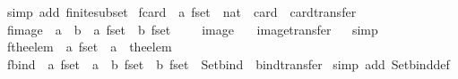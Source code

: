 \begin{isabellebody}
%
\isadelimproof
%
\endisadelimproof
%
\isatagproof
{}\isamarkupfalse%
\ {\isacharparenleft}simp\ add{\isacharcolon}\ finite{\isacharunderscore}subset{\isacharparenright}%
\endisatagproof
{\isafoldproof}%
%
\isadelimproof
\isanewline
%
\endisadelimproof
\isanewline
{}\isamarkupfalse%
\ fcard\ {\isacharcolon}{\isacharcolon}\ {\isachardoublequoteopen}{\isacharprime}a\ fset\ {\isasymRightarrow}\ nat{\isachardoublequoteclose}\ \ card\ \ card{\isacharunderscore}transfer%
\isadelimproof
\ %
\endisadelimproof
%
\isatagproof
\isacommand{{\isachardot}}\isamarkupfalse%
%
\endisatagproof
{\isafoldproof}%
%
\isadelimproof
%
\endisadelimproof
\isanewline
\isanewline
{}\isamarkupfalse%
\ fimage\ {\isacharcolon}{\isacharcolon}\ {\isachardoublequoteopen}{\isacharparenleft}{\isacharprime}a\ {\isasymRightarrow}\ {\isacharprime}b{\isacharparenright}\ {\isasymRightarrow}\ {\isacharprime}a\ fset\ {\isasymRightarrow}\ {\isacharprime}b\ fset{\isachardoublequoteclose}\ {\isacharparenleft}\ {\isachardoublequoteopen}{\isacharbar}{\isacharbackquote}{\isacharbar}{\isachardoublequoteclose}\ {}{}{\isacharparenright}\ \ image\isanewline
\ \ \ image{\isacharunderscore}transfer%
\isadelimproof
\ %
\endisadelimproof
%
\isatagproof
{}\isamarkupfalse%
\ simp%
\endisatagproof
{\isafoldproof}%
%
\isadelimproof
%
\endisadelimproof
\isanewline
\isanewline
{}\isamarkupfalse%
\ fthe{\isacharunderscore}elem\ {\isacharcolon}{\isacharcolon}\ {\isachardoublequoteopen}{\isacharprime}a\ fset\ {\isasymRightarrow}\ {\isacharprime}a{\isachardoublequoteclose}\ \ the{\isacharunderscore}elem%
\isadelimproof
\ %
\endisadelimproof
%
\isatagproof
\isacommand{{\isachardot}}\isamarkupfalse%
%
\endisatagproof
{\isafoldproof}%
%
\isadelimproof
%
\endisadelimproof
\isanewline
\isanewline
{}\isamarkupfalse%
\ fbind\ {\isacharcolon}{\isacharcolon}\ {\isachardoublequoteopen}{\isacharprime}a\ fset\ {\isasymRightarrow}\ {\isacharparenleft}{\isacharprime}a\ {\isasymRightarrow}\ {\isacharprime}b\ fset{\isacharparenright}\ {\isasymRightarrow}\ {\isacharprime}b\ fset{\isachardoublequoteclose}\ \ Set{\isachardot}bind\ \ bind{\isacharunderscore}transfer\isanewline
%
\isadelimproof
%
\endisadelimproof
%
\isatagproof
{}\isamarkupfalse%
\ {\isacharparenleft}simp\ add{\isacharcolon}\ Set{\isachardot}bind{\isacharunderscore}def{\isacharparenright}%

\end{isabellebody}
